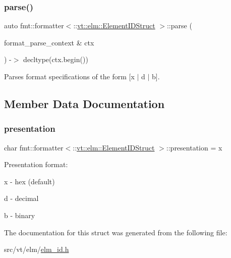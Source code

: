 \subsubsection{\texorpdfstring{parse()}{parse()}}
{\footnotesize\ttfamily auto fmt\+::formatter$<$\+::\hyperlink{structvt_1_1elm_1_1_element_i_d_struct}{vt\+::elm\+::\+Element\+I\+D\+Struct} $>$\+::parse (\begin{DoxyParamCaption}\item[{format\+\_\+parse\+\_\+context \&}]{ctx }\end{DoxyParamCaption}) -\/$>$ decltype(ctx.\+begin()) \hspace{0.3cm}{\ttfamily [inline]}}



Parses format specifications of the form \mbox{[}\textquotesingle{}x\textquotesingle{} $\vert$ \textquotesingle{}d\textquotesingle{} $\vert$ \textquotesingle{}b\textquotesingle{}\mbox{]}. 



\subsection{Member Data Documentation}
\mbox{\label{structfmt_1_1formatter_3_1_1vt_1_1elm_1_1_element_i_d_struct_01_4_af4ff8d1310326d50c5190b346197d424}} 
\subsubsection{\texorpdfstring{presentation}{presentation}}
{\footnotesize\ttfamily char fmt\+::formatter$<$\+::\hyperlink{structvt_1_1elm_1_1_element_i_d_struct}{vt\+::elm\+::\+Element\+I\+D\+Struct} $>$\+::presentation = \textquotesingle{}x\textquotesingle{}}

Presentation format\+:
\begin{DoxyItemize}
\item \textquotesingle{}x\textquotesingle{} -\/ hex (default)
\item \textquotesingle{}d\textquotesingle{} -\/ decimal
\item \textquotesingle{}b\textquotesingle{} -\/ binary 
\end{DoxyItemize}

The documentation for this struct was generated from the following file\+:\begin{DoxyCompactItemize}
\item 
src/vt/elm/\hyperlink{elm__id_8h}{elm\+\_\+id.\+h}\end{DoxyCompactItemize}
